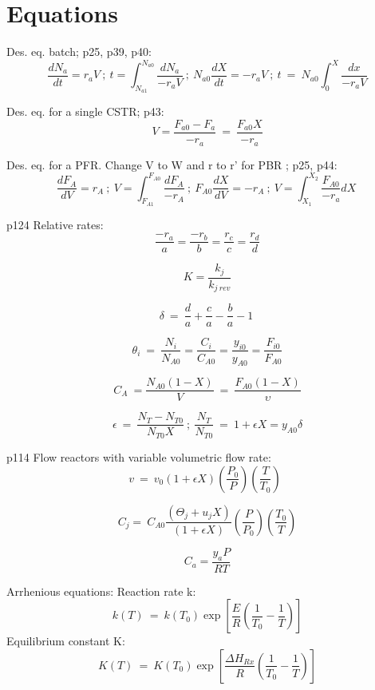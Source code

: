 \documentclass[8pts]{article}
\begin{document}
\twocolumn

\section*{Equations}

Des. eq. batch; p25, p39, p40: 
\[ \frac{dN_{a}}{dt}=r_{a}V \ ; \ t=\int_{N_{a1}}^{N_{a0}}\frac{dN_{a}}{-r_{a}V} \ ; \ N_{a0}\frac{dX}{dt}=-r_{a}V \ ; \ t\ =\ N_{a0}\int_{0}^{X}\frac{dx}{-r_{a}V}  \]

Des. eq. for a single CSTR; p43:
\[ V=\frac{F_{a0}-F_{a}}{-r_{a}} \ =\ \frac{F_{a0}X}{-r_{a}}  \]

 Des. eq. for a PFR. Change V to W and r to r' for PBR ; p25, p44:
\[ \frac{dF_{A}}{dV}=r_{A} \ ; \  V=\int_{F_{A1}}^{F_{A0}}\frac{dF_{A}}{-r_{A}} \ ; \ F_{A0}\frac{dX}{dV}=-r_{A} \ ;  \ V=\int_{X_1}^{X_2}\frac{F_{A0}}{-r_{a}}dX  \  \]



p124 Relative rates:
\[ \frac{-r_{a}}{a}=\frac{-r_{b}}{b}=\frac{r_{c}}{c}=\frac{r_{d}}{d} \]

\[ K=\frac{k_{j}}{k_{j \ rev}} \]

\[ \delta\ =\ \frac{d}{a}+\frac{c}{a}-\frac{b}{a}-1\ \]

\[ \theta_i \ =\ \frac{N_{i}}{N_{A0}}=\frac{C_{i}}{C_{A0}}=\frac{y_{i0}}{y_{A0}}=\frac{F_{i0}}{F_{A0}} \]


\[ C_A \ = \frac{N_{A0}(1-X)}{V} \ = \ \frac{F_{A0}(1-X)}{\upsilon} \]


 \[ \epsilon \ =\ \frac{N_{T}-N_{T0}}{N_{T0}X} \ ; \ \frac{N_T}{N_{T0}} \ = \ 1 + \epsilon X  =y_{A0}\delta \]


p114 Flow reactors with variable volumetric flow rate: 
 \[ v \ = \ v_{0} (1 + \epsilon X ) \left(\frac{P_{0}}{P}\right)\left(\frac{T}{T_{0}}\right) \  \ \]

\[ C_{j}=\ C_{A0}\frac{\left(\Theta_{j}+u_{j}X\right)}{\left(1+\epsilon X\right)}\left(\frac{P}{P_{0}}\right)\left(\frac{T_{0}}{T}\right)  \]

\[ C_{a}=\frac{y_{a}P}{RT}  \]

Arrhenious equations:  \newline
Reaction rate k:
\[ k\left(T\right)\ =\ k\left(T_{0}\right)\exp\left[\frac{E}{R}\left(\frac{1}{T_{0}}-\frac{1}{T}\right)\right] \]
Equilibrium constant K:
\[K\left(T\right)\ =\ K\left(T_{0}\right)\exp\left[\frac{\Delta H_{Rx}}{R}\left(\frac{1}{T_{0}}-\frac{1}{T}\right)\right]  \]
\end{document}
